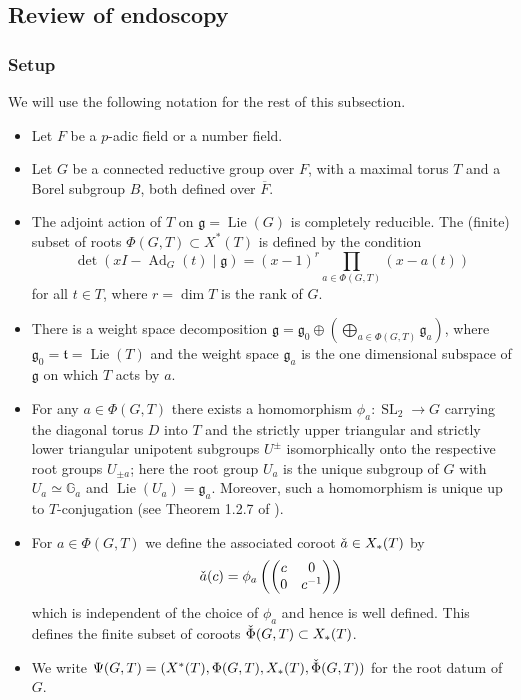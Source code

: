 \documentclass[11pt,a4paper]{article}
\theoremstyle{definition}
\theoremstyle{plain}
\theoremstyle{remark}
\theoremstyle{plain}
\DeclareMathOperator{\Lie}{Lie}
\DeclareMathOperator{\Ad}{Ad}
\DeclareMathOperator{\SL}{SL}
\begin{document}
\subsection{Review of endoscopy}\label{2.2}
\subsubsection{Setup}
We will use the following notation for the rest of this subsection.
\begin{itemize}
    \item Let $F$ be a $p$-adic field or a number field.
    \item Let $G$ be a connected reductive group over $F$, with a maximal torus $T$ and a Borel subgroup $B$, both defined over $\overline{F}$.
    \item The adjoint action of $T$ on $\mathfrak{g} = \Lie (G)$ is completely reducible. The (finite) subset of roots $\Phi(G,T) \subset X^*(T)$ is defined by the condition
    $$\det (xI - \Ad_G(t) \mid  \mathfrak{g}) = (x-1)^r \prod_{a \in \Phi(G,T)} (x - a(t))$$
    for all $t \in T$, where $r = \dim T$ is the rank of $G$.
    \item There is a weight space decomposition $\mathfrak{g} = \mathfrak{g}_0 \oplus \left( \bigoplus_{a \in \Phi(G,T)} \mathfrak{g}_a \right)$, where $\mathfrak{g}_0 = \mathfrak{t} = \Lie(T)$ and the weight space $\mathfrak{g}_a$ is the one dimensional subspace of $\mathfrak{g}$ on which $T$ acts by $a$.
    \item For any $a \in \Phi(G,T)$ there exists a homomorphism $\phi_a: \SL_2 \xrightarrow{} G$ carrying the diagonal torus $D$ into $T$ and the strictly upper triangular and strictly lower triangular unipotent subgroups $U^{\pm}$ isomorphically onto the respective root groups $U_{\pm a}$; here the root group $U_a$ is the unique subgroup of $G$ with $U_a \simeq \mathbb{G}_a$ and $\Lie(U_a) = \mathfrak{g}_a$. Moreover, such a homomorphism is unique up to $T$-conjugation (see Theorem 1.2.7 of \cite{ConradSGA3}).
    \item For $a \in \Phi(G,T)$ we define the associated coroot $\Check{a} \in X_*(T)$ by
    $$\Check{a}(c) = \phi_a \left( \begin{pmatrix} c & 0 \\ 0 & c^{-1} \end{pmatrix} \right)$$
    which is independent of the choice of $\phi_a$ and hence is well defined. This defines the finite subset of coroots $\Check{\Phi}(G,T) \subset X_*(T)$.
    \item We write $\Psi(G,T) = (X^*(T), \Phi(G,T), X_*(T), \Check{\Phi}(G,T))$ for the root datum of $G$.

\end{itemize}
\end{document}
